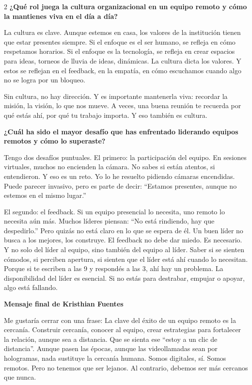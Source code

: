 \documentclass[12pt,spanish,Letterpaper,openany]{book}
\begin{document}
\begin {multicols}{2}
\textbf{¿Qué rol juega la cultura organizacional en un equipo remoto y cómo la mantienes viva en el día a día?}

La cultura es clave. Aunque estemos en casa, los valores de la institución tienen que estar presentes siempre.
Si el enfoque es el ser humano, se refleja en cómo respetamos horarios. Si el enfoque es la tecnología, se refleja en crear espacios para ideas, torneos de lluvia de ideas, dinámicas.
La cultura dicta los valores. Y estos se reflejan en el feedback, en la empatía, en cómo escuchamos cuando algo no se logra por un bloqueo.

Sin cultura, no hay dirección. Y es importante mantenerla viva: recordar la misión, la visión, lo que nos mueve.
A veces, una buena reunión te recuerda por qué estás ahí, por qué tu trabajo importa. Y eso también es cultura.

\textbf{¿Cuál ha sido el mayor desafío que has enfrentado liderando equipos remotos y cómo lo superaste?}

Tengo dos desafíos puntuales. El primero: la participación del equipo. En sesiones virtuales, muchos no encienden la cámara. No sabes si están atentos, si entendieron. Y eso es un reto.
Yo lo he resuelto pidiendo cámaras encendidas. Puede parecer invasivo, pero es parte de decir: ``Estamos presentes, aunque no estemos en el mismo lugar.''

El segundo: el feedback. Si un equipo presencial lo necesita, uno remoto lo necesita aún más.
Muchos líderes piensan: ``No está rindiendo, hay que despedirlo.'' Pero quizás no está claro en lo que se espera de él. Un buen líder no busca a los mejores, los construye.
El feedback no debe dar miedo. Es necesario. Y no solo del líder al equipo, sino también del equipo al líder. Saber si se sienten cómodos, si perciben apertura, si sienten que el líder está ahí cuando lo necesitan.
Porque si te escriben a las 9 y respondés a las 3, ahí hay un problema. La disponibilidad del líder es esencial. Si no estás para destrabar, empujar o apoyar, algo está fallando.

\textbf{Mensaje final de Kristhian Fuentes}

Me gustaría cerrar con una frase:
La clave del éxito de un equipo remoto es la cercanía.
Construir cercanía, conocer al equipo, crear estrategias para fortalecer la relación, aunque sea a distancia. Que se sienta ese ``estoy a un clic de distancia''.
Aunque pasen las épocas, aunque las videollamadas sean por hologramas, nada sustituye la cercanía humana.
Somos digitales, sí. Somos remotos. Pero no tenemos que ser lejanos. Al contrario, debemos ser más cercanos que nunca.

\end {multicols}
\end{document}
